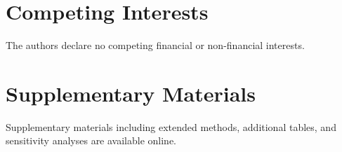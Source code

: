 \documentclass[11pt,a4paper]{article}
\begin{document}
\section*{Competing Interests}

The authors declare no competing financial or non-financial interests.

\section*{Supplementary Materials}

Supplementary materials including extended methods, additional tables, and sensitivity analyses are available online.

% 
% 
\end{document}
